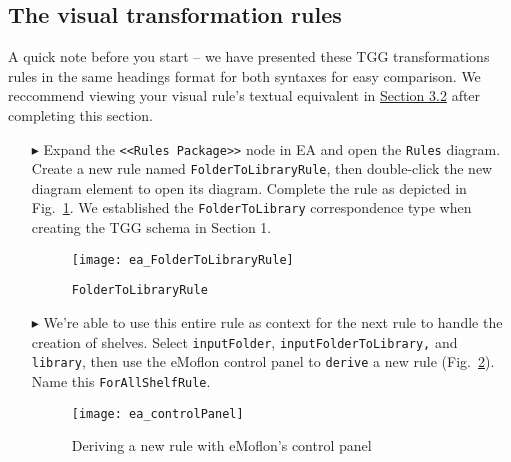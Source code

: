 \newpage
\hypertarget{treeToModel vis}{}
\subsection{The visual transformation rules}
\visHeader

A quick note before you start -- we have presented these TGG transformations rules in the same headings format for both syntaxes for easy comparison. We
reccommend viewing your visual rule's textual equivalent in \hyperlink{treeToModel tex}{Section 3.2} after completing this section.

\begin{itemize}

\subsubsection{FolderToLibraryRule} %

\item[$\blacktriangleright$] Expand the \texttt{<<Rules Package>>} node in EA and open the \texttt{Rules} diagram. Create a new rule named
\texttt{FolderToLibraryRule}, then double-click the new diagram element to open its diagram. Complete the rule as depicted in
Fig.~\ref{ea:FolderIntoLibrary_Complete}. We established the \texttt{FolderToLibrary} correspondence type when creating the TGG schema in Section 1.

\vspace{0.5cm}

\begin{figure}[htbp]
\begin{center}
  \texttt{[image: ea\_FolderToLibraryRule]}
  \caption{\texttt{FolderToLibraryRule}}
  \label{ea:FolderIntoLibrary_Complete}
\end{center}
\end{figure}

\item[$\blacktriangleright$] We're able to use this entire rule as context for the next rule to handle the creation of shelves. Select
\texttt{inputFolder}, \texttt{in\-put\-Fol\-der\-To\-Lib\-rary,} and \texttt{library}, then use the eMoflon control panel to \texttt{derive} a new rule
(Fig.~\ref{ea:controlPanel}).
Name this \texttt{ForAllShelfRule}.

\vspace{0.5cm}

\begin{figure}[htbp]
\begin{center}
  \texttt{[image: ea\_controlPanel]}
  \caption{Deriving a new rule with eMoflon's control panel}
  \label{ea:controlPanel}
\end{center}
\end{figure}


\end{itemize}
